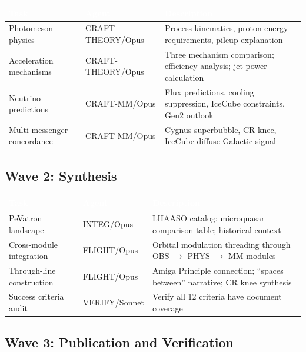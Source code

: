 \documentclass[11pt,letterpaper]{article}
\newcommand{\tableheader}[1]{\textbf{\sffamily\textcolor{white}{#1}}}
\begin{document}
\begin{center}
\begin{tabularx}{\textwidth}{L{3.5cm}L{2cm}X}
\toprule
{}
\tableheader{Task} & \tableheader{Agent} & \tableheader{Description} \\
\midrule
Photomeson physics & CRAFT-THEORY/Opus & Process kinematics, proton energy requirements, pileup explanation \\
Acceleration mechanisms & CRAFT-THEORY/Opus & Three mechanism comparison; efficiency analysis; jet power calculation \\
Neutrino predictions & CRAFT-MM/Opus & Flux predictions, cooling suppression, IceCube constraints, Gen2 outlook \\
Multi-messenger concordance & CRAFT-MM/Opus & Cygnus superbubble, CR knee, IceCube diffuse Galactic signal \\
\bottomrule
\end{tabularx}
\end{center}

\subsection{Wave 2: Synthesis}

\begin{center}
\begin{tabularx}{\textwidth}{L{3.5cm}L{2cm}X}
\toprule
{}
\tableheader{Task} & \tableheader{Agent} & \tableheader{Description} \\
\midrule
PeVatron landscape & INTEG/Opus & LHAASO catalog; microquasar comparison table; historical context \\
Cross-module integration & FLIGHT/Opus & Orbital modulation threading through OBS $\to$ PHYS $\to$ MM modules \\
Through-line construction & FLIGHT/Opus & Amiga Principle connection; ``spaces between'' narrative; CR knee synthesis \\
Success criteria audit & VERIFY/Sonnet & Verify all 12 criteria have document coverage \\
\bottomrule
\end{tabularx}
\end{center}

\subsection{Wave 3: Publication and Verification}
\end{document}
